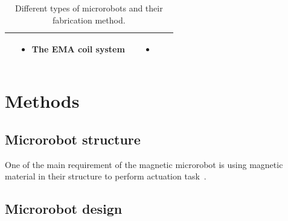 \documentclass[12pt,a4paper,titlepage]{report}
\begin{document}
\begin{table}[h!]
\begin{tabular}{ c m{2.5cm}  m{4.3cm} m{3cm} m{2cm}}
\begin{minipage}[t]{3cm}
\begin{itemize}
      \end{itemize}
    \end{minipage}
    & 
    \begin{minipage}[t]{4cm}
      \begin{itemize}
        \item The EMA coil system
     
      \end{itemize}
    \end{minipage}
&



	&
	   \begin{itemize}
        \item \citep{ko2012jellyfish}
   
      \end{itemize}
    \\ \hline








  \end{tabular}
  \caption{Different types of microrobots and their fabrication method.}\label{Micro}
\end{table}



\chapter{Methods}

\section{Microrobot structure}

One of the main requirement of the magnetic microrobot is using magnetic material in their structure 
to perform actuation task~\citep{qiu2014noncytotoxic}. 







\section{Microrobot design}

\end{document}
